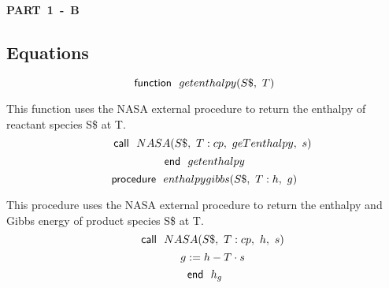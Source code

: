 \documentclass[10pt,fleqn]{article}
\newcommand{\F}[1]{\mbox{$#1$}}
\newcommand{\K}[1]{\mbox{\sf#1\ \ \mit}}
\newcommand{\V}[1]{\mbox{$ #1 $}}
\newcommand{\I}{\mbox{\hspace{0.20in}}}
\begin{document}
\begin{center}
\bf \mbox{PART 1 - B}
\vspace{0.2 in}
\end{center}
\subsection*{Equations}
\begin{equation}
\label{EES Eqn:1}
\K{function} \F{getenthalpy}{ \left( S\$,\ T \right) } 
\end{equation}

\vspace{0.04in}
\noindent
\rm This function uses the NASA external procedure to return the enthalpy of reactant species S\$ at T.
\begin{equation}
\I \label{EES Eqn:2}
\K{call} \F{NASA}{ \left( S\$,\ T:\V{cp} ,\ \V{geTenthalpy} ,\ s \right) } 
\end{equation}
\begin{equation}
\label{EES Eqn:3}
\K{end} \V{getenthalpy}  
\end{equation}
\vspace{0.1 in}
\begin{equation}
\label{EES Eqn:4}
\K{procedure} \F{enthalpygibbs}{ \left( S\$,\ T:h,\ g \right) } 
\end{equation}

\vspace{0.04in}
\noindent
\rm This procedure uses the NASA external procedure to return the enthalpy and Gibbs energy of product species S\$ at T.
\begin{equation}
\I \label{EES Eqn:5}
\K{call} \F{NASA}{ \left( S\$,\ T:\V{cp} ,\ h,\ s \right) } 
\end{equation}
\begin{equation}
\I \label{EES Eqn:6}
g:=h-T\cdot s 
\end{equation}
\begin{equation}
\label{EES Eqn:7}
\K{end} h_{g} 
\end{equation}
\end{document}

